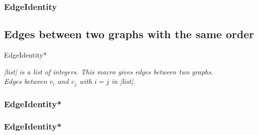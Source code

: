 \subsubsection{EdgeIdentity}
\begin{center}
\begin{tkzexample}
\end{tkzexample}
\end{center}
 
\vfill
\newpage  
\subsection{Edges between two graphs with the same order }

\begin{NewMacroBox}{EdgeIdentity*}{}

\medskip
\emph{|list| is a list of  integers. This macro gives edges between two graphs.\\
Edges between $v_i$ and $v_j$ with $i=j$ in |list|.\\}

\end{NewMacroBox}

\subsubsection{EdgeIdentity*}
\begin{center}
\begin{tkzexample}
\end{tkzexample}
\end{center}

\subsubsection{EdgeIdentity*}
\begin{center}
\begin{tkzexample}
\end{tkzexample}
\end{center}

